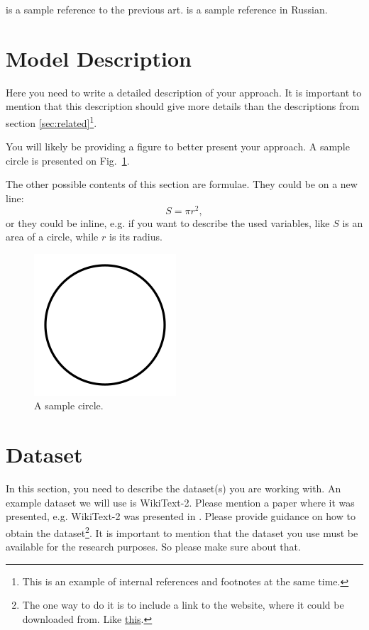 \documentclass{article}
\begin{document}
\cite{levenshtein1966binary} is a sample reference to the previous art. \cite{levenshtein1966dvoichnie} is a sample reference in Russian.

\section{Model Description}
Here you need to write a detailed description of your approach. It is important to mention that this description should give more details than the descriptions from section \ref{sec:related}\footnote{This is an example of internal references and footnotes at the same time.}. 

You will likely be providing a figure to better present your approach. A sample circle is presented on Fig.~\ref{fig:circle}.

The other possible contents of this section are formulae. They could be on a new line:
$$S=\pi r^2,$$
or they could be inline, e.g. if you want to describe the used variables, like $S$ is an area of a circle, while $r$ is its radius. 

\begin{figure}[!tbh]
    \centering
    \includegraphics[width=0.3\linewidth]{circle.png}
    \caption{A sample circle.}
    \label{fig:circle}
\end{figure}

\section{Dataset}
In this section, you need to describe the dataset(s) you are working with. 
An example dataset we will use is WikiText-2. Please mention a paper where it was presented, e.g. WikiText-2 was presented in \cite{merity2017pointer}. Please provide guidance on how to obtain the dataset\footnote{The one way to do it is to include a link to the website, where it could be downloaded from. Like \href{https://blog.einstein.ai/the-wikitext-long-term-dependency-language-modeling-dataset/}{this}.}. It is important to mention that the dataset you use must be available for the research purposes. So please make sure about that.
\end{document}
